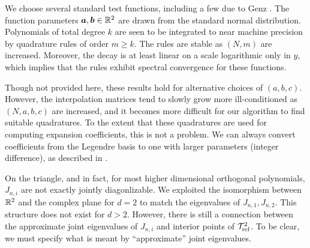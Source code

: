 We choose several standard test functions, including a few due to Genz \cite{genz}. The function parameters $\boldsymbol{a},\boldsymbol{b} \in \mathbb{R}^2$ are drawn from the standard normal distribution. Polynomials of total degree $k$ are seen to be integrated to near machine precision by quadrature rules of order $m \geq k$. The rules are stable as $(N,m)$ are increased. Moreover, the decay is at least linear on a scale logarithmic only in $y$, which implies that the rules exhibit spectral convergence for these functions. 

Though not provided here, these results hold for alternative choices of $(a,b,c)$. However, the interpolation matrices tend to slowly grow more ill-conditioned as $(N,a,b,c)$ are increased, and it becomes more difficult for our algorithm to find suitable quadratures. To the extent that these quadratures are used for computing expansion coefficients, this is not a problem. We can always convert coefficients from the Legendre basis to one with larger parameters (integer difference), as described in .

On the triangle, and in fact, for most higher dimensional orthogonal polynomials, $J_{n,i}$ are not exactly jointly diagonlizable. We exploited the isomorphism between $\mathbb{R}^2$ and the complex plane for $d=2$ to match the eigenvalues of $J_{n,1},J_{n,2}$. This structure does not exist for $d>2$. However, there is still a connection between the approximate joint eigenvalues of $J_{n,i}$ and interior points of $\mathcal{T}_{\text{ref}}^2$. To be clear, we must specify what is meant by ``approximate'' joint eigenvalues. 

